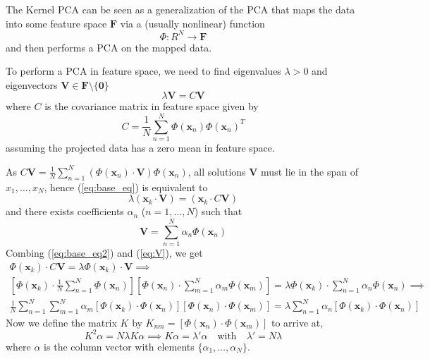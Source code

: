 \documentclass[12pt]{article}
\newcommand{\F}{\mathbf{F}}
\newcommand{\V}{\mathbf{V}}
\newcommand{\x}{\mathbf{x}}
\begin{document}
	The Kernel PCA can be seen as a generalization of the PCA that maps the data into some feature space $\mathbf{F}$ via a (usually nonlinear) function 
	\[
		\Phi:R^N \to \F
	\]
	and then performs a PCA on the mapped data. 
	
	To perform a PCA in feature space, we need to find eigenvalues $\lambda > 0$ and eigenvectors $\mathbf{V} \in \mathbf{F\setminus\{0\}}$
	\begin{equation}
		\lambda\V = C\V
	\end{equation}
	where $C$ is the covariance matrix in feature space given by
	\begin{equation}
		C = \frac{1}{N}\sum_{n=1}^{N}\Phi(\x_n)\Phi(\x_n)^T \label{eq:base_eq}
	\end{equation}
	assuming the projected data has a zero mean in feature space. 
	
	As $C\V = \frac{1}{N}\sum_{n=1}^{N}(\Phi(\x_n)\cdot\V)\Phi(\x_n)$, all solutions $\V$ must lie in the span of $x_1,\dots,x_N$, hence (\ref{eq:base_eq}) is equivalent to
	\begin{equation}
		\lambda(\x_k \cdot \V) = (\x_k \cdot C\V) \label{eq:base_eq2}
	\end{equation}
	and there exists coefficients $\alpha_n$ ($n=1,\dots, N$) such that
	\begin{equation}
		\V = \sum_{n=1}^{N}\alpha_n\Phi(\x_n) \label{eq:V}
	\end{equation}
	Combing (\ref{eq:base_eq2}) and (\ref{eq:V}), we get
	\begin{gather*}
		\Phi(\x_k) \cdot C \V = \lambda \Phi(\x_k) \cdot \V \implies\\ 
		[\Phi(\x_k) \cdot \frac{1}{N}\sum_{n=1}^{N}\Phi(\x_n)][\Phi(\x_n) \cdot \sum_{m=1}^{N}\alpha_m\Phi(\x_m)] = \lambda \Phi(\x_k) \cdot \sum_{n=1}^{N}\alpha_n \Phi(\x_n) \implies\\
		 \frac{1}{N}\sum_{n=1}^{N}\sum_{m=1}^{N}\alpha_m[\Phi(\x_k) \cdot \Phi(\x_n)][\Phi(\x_n) \cdot \Phi(\x_m)] = \lambda \sum_{n=1}^{N}\alpha_n [\Phi(\x_k) \cdot \Phi(\x_n)]
	\end{gather*}
	Now we define the matrix $K$ by $K_{nm} = [\Phi(\x_n) \cdot \Phi(\x_m)]$ to arrive at,
	\begin{equation}
		K^2 \alpha=N \lambda K \alpha \implies K \alpha = \lambda'\alpha \quad\text{with}\quad \lambda' = N \lambda
	\end{equation}
	where $\alpha$ is the column vector with elements $\{\alpha_1, \dots, \alpha_N\}$.
	
\end{document}
